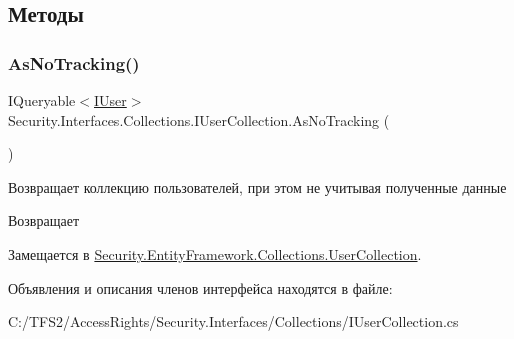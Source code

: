 \subsection{Методы}
\mbox{\label{interface_security_1_1_interfaces_1_1_collections_1_1_i_user_collection_a0c07c3db6d4b0123b4713c3ce436ef61}} 
\subsubsection{\texorpdfstring{As\+No\+Tracking()}{AsNoTracking()}}
{\footnotesize\ttfamily I\+Queryable$<$\hyperlink{interface_security_1_1_interfaces_1_1_model_1_1_i_user}{I\+User}$>$ Security.\+Interfaces.\+Collections.\+I\+User\+Collection.\+As\+No\+Tracking (\begin{DoxyParamCaption}{ }\end{DoxyParamCaption})}



Возвращает коллекцию пользователей, при этом не учитывая полученные данные 

\begin{DoxyReturn}{Возвращает}

\end{DoxyReturn}


Замещается в \hyperlink{class_security_1_1_entity_framework_1_1_collections_1_1_user_collection_a1c8263a1db7270fbe6ce624681052d64}{Security.\+Entity\+Framework.\+Collections.\+User\+Collection}.



Объявления и описания членов интерфейса находятся в файле\+:\begin{DoxyCompactItemize}
\item 
C\+:/\+T\+F\+S2/\+Access\+Rights/\+Security.\+Interfaces/\+Collections/I\+User\+Collection.\+cs\end{DoxyCompactItemize}
